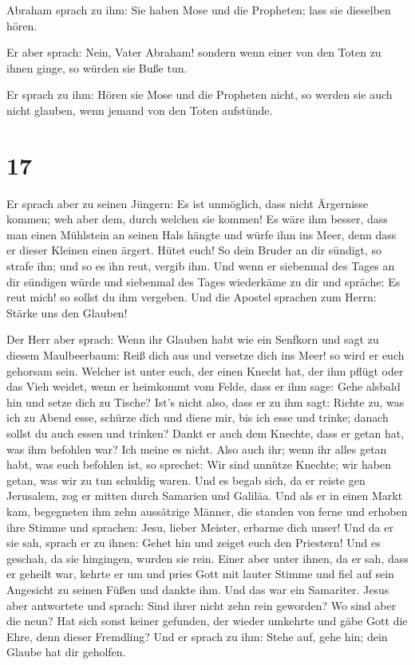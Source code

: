  Abraham sprach zu ihm: Sie haben Mose und die Propheten;
lass sie dieselben hören.

 Er aber sprach: Nein, Vater Abraham! sondern wenn einer
von den Toten zu ihnen ginge, so würden sie Buße tun.

 Er sprach zu ihm: Hören sie Mose und die Propheten
nicht, so werden sie auch nicht glauben, wenn jemand von den Toten
aufstünde.

\hypertarget{section-16}{%
\section{17}\label{section-16}}

 Er sprach aber zu seinen Jüngern: Es ist unmöglich, dass
nicht Ärgernisse kommen; weh aber dem, durch welchen sie kommen!
 Es wäre ihm besser, dass man einen Mühlstein an seinen
Hals hängte und würfe ihm ins Meer, denn dass er dieser Kleinen einen
ärgert.  Hütet euch! So dein Bruder an dir sündigt, so
strafe ihn; und so es ihn reut, vergib ihm.  Und wenn er
siebenmal des Tages an dir sündigen würde und siebenmal des Tages
wiederkäme zu dir und spräche: Es reut mich! so sollst du ihm vergeben.
 Und die Apostel sprachen zum Herrn: Stärke uns den
Glauben!

 Der Herr aber sprach: Wenn ihr Glauben habt wie ein
Senfkorn und sagt zu diesem Maulbeerbaum: Reiß dich aus und versetze
dich ins Meer! so wird er euch gehorsam sein.  Welcher ist
unter euch, der einen Knecht hat, der ihm pflügt oder das Vieh weidet,
wenn er heimkommt vom Felde, dass er ihm sage: Gehe alsbald hin und
setze dich zu Tische?  Ist's nicht also, dass er zu ihm
sagt: Richte zu, was ich zu Abend esse, schürze dich und diene mir, bis
ich esse und trinke; danach sollst du auch essen und trinken?
 Dankt er auch dem Knechte, dass er getan hat, was ihm
befohlen war? Ich meine es nicht.  Also auch ihr; wenn
ihr alles getan habt, was euch befohlen ist, so sprechet: Wir sind
unnütze Knechte; wir haben getan, was wir zu tun schuldig waren.
 Und es begab sich, da er reiste gen Jerusalem, zog er
mitten durch Samarien und Galiläa.  Und als er in einen
Markt kam, begegneten ihm zehn aussätzige Männer, die standen von ferne
 und erhoben ihre Stimme und sprachen: Jesu, lieber
Meister, erbarme dich unser!  Und da er sie sah, sprach
er zu ihnen: Gehet hin und zeiget euch den Priestern! Und es geschah, da
sie hingingen, wurden sie rein.  Einer aber unter ihnen,
da er sah, dass er geheilt war, kehrte er um und pries Gott mit lauter
Stimme  und fiel auf sein Angesicht zu seinen Füßen und
dankte ihm. Und das war ein Samariter.  Jesus aber
antwortete und sprach: Sind ihrer nicht zehn rein geworden? Wo sind aber
die neun?  Hat sich sonst keiner gefunden, der wieder
umkehrte und gäbe Gott die Ehre, denn dieser Fremdling? 
Und er sprach zu ihm: Stehe auf, gehe hin; dein Glaube hat dir geholfen.

